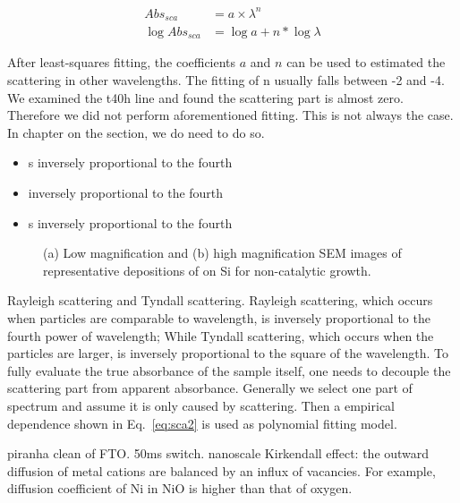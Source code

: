 \begin{align}
Abs_{sca}  & = a\times \lambda^{n}  \label{eq:sca1}\\
\log{Abs_{sca}} & = \log{a} + n*\log{\lambda} \label{eq:sca2}
\end{align}

After least-squares fitting, the coefficients $a$ and $n$ can be used to estimated the scattering in other wavelengths. The fitting of n usually falls between -2 and -4. We examined the t40h line and found the scattering part is almost zero. Therefore we did not perform aforementioned fitting. This is not always the case. In chapter on the  section, we do need to do so.

\begin{itemize}
\item s inversely proportional to the fourth
\item  inversely proportional to the fourth
\item s inversely proportional to the fourth
\end{itemize}

\begin{figure}[htb]
\centering
{}\hspace{0.04\textwidth}
\caption[Representative morphologies of  on Si]{(a) Low magnification and (b) high magnification SEM images of representative depositions of  on Si for non-catalytic growth.}
\label{fig:mosisem}
\end{figure}

Rayleigh scattering and Tyndall scattering. Rayleigh scattering, which occurs when particles are comparable to wavelength, is inversely proportional to the fourth power of wavelength; While Tyndall scattering, which occurs when the particles are larger, is inversely proportional to the square of the wavelength. To fully evaluate the true absorbance of the sample itself, one needs to decouple the scattering part from apparent absorbance. Generally we select one part of spectrum and assume it is only caused by scattering. Then a empirical dependence shown in Eq.~\ref{eq:sca2} is used as polynomial fitting model.



piranha clean of FTO. 50ms switch.\cite{Scherer2012} nanoscale Kirkendall effect: the outward diffusion of metal cations are balanced by an influx of vacancies. For example, diffusion coefficient of Ni in NiO is higher than that of oxygen.
